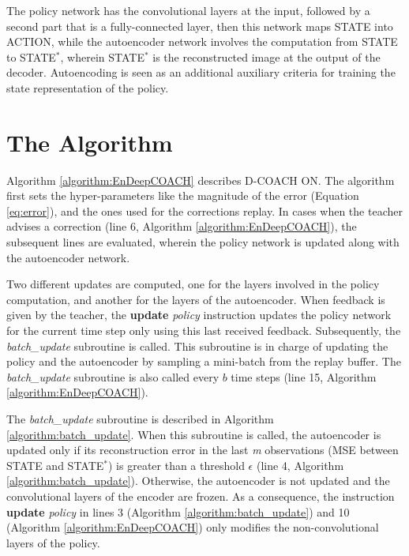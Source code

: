 The policy network has the convolutional layers at the input, followed by a second part that is a fully-connected layer, then this network maps STATE into ACTION, while the autoencoder network involves the computation from STATE to STATE$^{*}$, wherein  STATE$^{*}$ is the reconstructed image at the output of the decoder. Autoencoding is seen as an additional auxiliary criteria for training the state representation of the policy. 


\section{The Algorithm}
Algorithm \ref{algorithm:EnDeepCOACH} describes D-COACH ON. The algorithm first sets the hyper-parameters like the magnitude of the error (Equation \ref{eq:error}), and the ones used for the corrections replay. In cases when the teacher advises a correction (line 6, Algorithm \ref{algorithm:EnDeepCOACH}), the subsequent lines are evaluated, wherein the policy network is updated along with the autoencoder network.

Two different updates are computed, one for the layers involved in the policy computation, and another for the layers of the autoencoder. When feedback is given by the teacher, the \textbf{update} \emph{policy} instruction updates the policy network for the current time step only using this last received feedback. Subsequently, the \emph{batch\_update} subroutine is called. This subroutine is in charge of updating the policy and the autoencoder by sampling a mini-batch from the replay buffer. The \emph{batch\_update} subroutine is also called every $b$ time steps (line 15, Algorithm \ref{algorithm:EnDeepCOACH}).

The \emph{batch\_update} subroutine is described in Algorithm \ref{algorithm:batch_update}. When this subroutine is called, the autoencoder is updated only if its reconstruction error in the last \emph{m} observations (MSE between STATE and STATE$^{*}$) is greater than a threshold $\epsilon$ (line 4, Algorithm \ref{algorithm:batch_update}). Otherwise, the autoencoder is not updated and the convolutional layers of the encoder are frozen. As a consequence, the instruction \textbf{update} \emph{policy} in lines 3 (Algorithm \ref{algorithm:batch_update}) and 10 (Algorithm \ref{algorithm:EnDeepCOACH}) only modifies the non-convolutional layers of the policy. 

